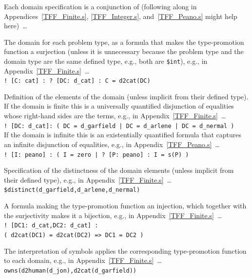 \documentclass{easychair}
\newcommand{\smalltt}[1]{\small \texttt{#1}}
\newenvironment{packed_itemize}{
\vspace*{-0.3em}
\begin{itemize}
\setlength{\partopsep}{0pt}
\setlength{\itemsep}{1pt}
\setlength{\parskip}{0pt}
\setlength{\parsep}{0pt}
}{\end{itemize}}
\begin{document}
Each domain specification is a conjunction of (following along in Appendices~\ref{TFF_Finite.s}, 
\ref{TFF_Integer.s}, and~\ref{TFF_Peano.s} might help here)~\ldots
\begin{packed_itemize}
\item The domain for each problem type, as a formula that makes the type-promotion function a 
      surjection (unless it is unnecessary because the problem type and the domain type are the
      same defined type, e.g., both are {\tt \$int}), e.g., in Appendix~\ref{TFF_Finite.s}~\ldots\\
      \hspace*{0.5cm}\smalltt{! [C: cat] : ? [DC: d\_cat] : C = d2cat(DC)}
\item Definition of the elements of the domain (unless implicit from their defined type).
      If the domain is finite this is a universally quantified disjunction of equalities whose 
      right-hand sides are the terms, e.g., in Appendix~\ref{TFF_Finite.s}~\ldots\\
      \hspace*{0.5cm}\smalltt{! [DC: d\_cat]: ( DC = d\_garfield | DC = d\_arlene | DC = d\_nermal )}\\
      If the domain is infinite this is an existentially quantified formula that captures an 
      infinite disjunction of equalities, e.g., in Appendix~\ref{TFF_Peano.s}~\ldots\\
      \hspace*{0.5cm}\smalltt{! [I: peano] : ( I = zero | ? [P: peano] : I = s(P) )}
\item Specification of the distinctness of the domain elements (unless implicit from their
      defined type), e.g., in Appendix~\ref{TFF_Finite.s}~\ldots\\
      \hspace*{0.5cm}\smalltt{\$distinct(d\_garfield,d\_arlene,d\_nermal)}
\item A formula making the type-promotion function an injection,
      which together with the surjectivity makes it a bijection, e.g., in 
      Appendix~\ref{TFF_Finite.s}~\ldots\\
      \hspace*{0.5cm}\smalltt{! [DC1: d\_cat,DC2: d\_cat] :}\\
      \hspace*{1.0cm}\smalltt{( d2cat(DC1) = d2cat(DC2) => DC1 = DC2 )}
\end{packed_itemize}
\vspace*{-0.5em}
The interpretation of symbols applies the corresponding type-promotion function to each domain, 
e.g., in Appendix~\ref{TFF_Finite.s}~\ldots\\
\hspace*{0.5cm}\smalltt{owns(d2human(d\_jon),d2cat(d\_garfield))}
\end{document}
